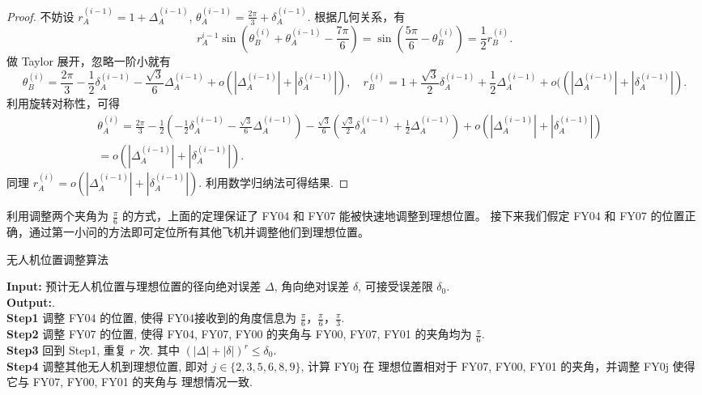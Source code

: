 \documentclass{my_paper}
\begin{document}
\begin{proof}
    不妨设 $r_A^{(i-1)}=1+\Delta_A^{(i-1)}$, $\theta_A^{(i-1)}=\frac{2\pi}{3}+\delta_A^{(i-1)}$. 根据几何关系，有 
    $$
    r_A^{i-1}\sin(\theta_B^{(i)}+\theta_A^{(i-1)}-\frac{7\pi}{6})=\sin(\frac{5\pi}{6}-\theta_{B}^{(i)})=\frac12 r_B^{(i)}.
    $$
    做 Taylor 展开，忽略一阶小就有
    $$
        \theta_{B}^{(i)}= \frac{2\pi}3-\frac{1}{2} \delta_A^{(i-1)}-\frac{\sqrt 3}6 \Delta_A^{(i-1)}+o(|\Delta_A^{(i-1)}|+|\delta_A^{(i-1)}|)
        ,\quad r_{B}^{(i)} = 1 +\frac{\sqrt3}{2} \delta_A^{(i-1)}+\frac12 \Delta_A^{(i-1)}+o((|\Delta_A^{(i-1)}|+|\delta_A^{(i-1)}|).
    $$
    利用旋转对称性，可得
    \begin{equation}
    \begin{aligned}
        \theta_{A}^{(i)}= \frac{2\pi}3-\frac{1}{2} (-\frac{1}{2} \delta_A^{(i-1)}-\frac{\sqrt 3}6 \Delta_A^{(i-1)})
        -\frac{\sqrt 3}6 (\frac{\sqrt3}{2} \delta_A^{(i-1)}+\frac12 \Delta_A^{(i-1)}) +o(|\Delta_A^{(i-1)}|+|\delta_A^{(i-1)}|)
        \\=o(|\Delta_A^{(i-1)}|+|\delta_A^{(i-1)}|).&
    \end{aligned}
    \label{2}
    \end{equation}
    同理 $r_{A}^{(i)}=o(|\Delta_A^{(i-1)}|+|\delta_A^{(i-1)}|).$ 利用数学归纳法可得结果. 
\end{proof}

    利用调整两个夹角为 $\frac\pi6$ 的方式，上面的定理保证了 FY04 和 FY07 能被快速地调整到理想位置。
    接下来我们假定 FY04 和 FY07 的位置正确，通过第一小问的方法即可定位所有其他飞机并调整他们到理想位置。

\begin{algorithm}[H]
    \caption{\small 无人机位置调整算法}
    \textbf{Input:} 预计无人机位置与理想位置的径向绝对误差 $\Delta$, 角向绝对误差 $\delta$, 可接受误差限 $\delta_0$.\\
    \textbf{Output:}. \\
    \textbf{Step1} 调整 FY04 的位置, 使得 FY04接收到的角度信息为 $\frac{\pi}{6}$，$\frac{\pi}{6}$，$\frac{\pi}{3}$.\\
    \textbf{Step2} 调整 FY07 的位置, 使得 FY04, FY07, FY00 的夹角与 FY00, FY07, FY01 的夹角均为 $\frac{\pi}{6}$.\\
    \textbf{Step3} 回到 Step1, 重复 $r$ 次. 其中 $(|\Delta|+|\delta|)^r\leq\delta_0$. \\
    \textbf{Step4} 调整其他无人机到理想位置, 即对 $j\in\{2,3,5,6,8,9\}$, 计算 FY0j 在
    理想位置相对于 FY07, FY00, FY01 的夹角，并调整 FY0j 使得它与 FY07, FY00, FY01 的夹角与
    理想情况一致.\\
\end{algorithm}
\end{document}
